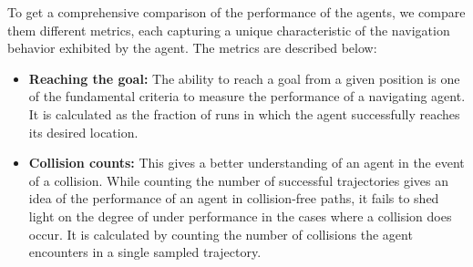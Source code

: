 To get a comprehensive comparison of the performance of the agents, we compare them  different metrics, each capturing a unique characteristic of the navigation behavior exhibited by the agent. The metrics are described below:
\begin{itemize}
        \item \textbf{Reaching the goal:} The ability to reach a goal from a given position is one of the fundamental criteria to measure the performance of a navigating agent. It is calculated as the fraction of runs in which the agent successfully reaches its desired location.        
        
        \item \textbf{Collision counts:} This gives a better understanding of an agent in the event of a collision. While counting the number of successful trajectories gives an idea of the performance of an agent in collision-free paths, it fails to shed light on the degree of under performance in the cases where a collision does occur. It is calculated by counting the number of collisions the agent encounters in a single sampled trajectory.
        


\end{itemize}
